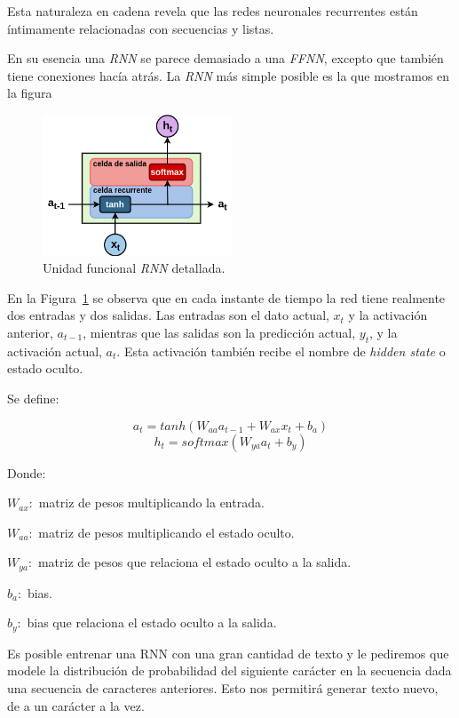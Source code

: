 \documentclass[a4paper,12pt]{article}
\begin{document}
Esta naturaleza en cadena revela que las redes neuronales recurrentes están íntimamente relacionadas con secuencias y listas.

En su esencia una \textit{RNN} se parece demasiado a una \textit{FFNN}, excepto que también tiene conexiones hacía atrás.
La \textit{RNN} más simple posible es la que mostramos en la figura 


\begin{figure}[H]
	\begin{center}				
	\includegraphics[width=0.5\textwidth]{rnnunitv2.png}
  	\caption{Unidad funcional \textit{RNN} detallada.}
  	\label{fig:rnnunitv2}
  	\end{center}
\end{figure}

En la Figura~\ref{fig:rnnunitv2} se observa que en cada instante de tiempo la red tiene realmente dos entradas y dos salidas. Las entradas son el dato actual, $x_t$ y la activación anterior, $a_{t-1}$, mientras que las salidas son la predicción actual, $y_t$, y la activación actual, $a_t$. Esta activación también recibe el nombre de \textit{hidden state} o estado oculto.

Se define:

$$ a_{t} = tanh(W_{aa}a_{t-1}+W_{ax}x_t+b_a) $$
$$ h_t = softmax(W_{ya}a_t + b_y) $$

Donde:

$ W_{ax}:$ matriz de pesos multiplicando la entrada.

$ W_{aa}:$ matriz de pesos multiplicando el estado oculto.

$ W_{ya}:$ matriz de pesos que relaciona el estado oculto a la salida.

$b_a:$ bias.

$b_y:$ bias que relaciona el estado oculto a la salida.

Es posible entrenar una RNN con una gran cantidad de texto y le pediremos que modele la distribución de probabilidad del siguiente carácter en la secuencia dada una secuencia de caracteres anteriores. Esto nos permitirá generar texto nuevo, de a un carácter a la vez.
\end{document}

